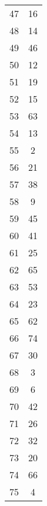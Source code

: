 \begin{table}
\begin{tabular}{c c }
47 & 16 \\
48 & 14 \\
49 & 46 \\
50 & 12 \\
51 & 19 \\
52 & 15 \\
53 & 63 \\
54 & 13 \\
55 & 2 \\
56 & 21 \\
57 & 38 \\
58 & 9 \\
59 & 45 \\
60 & 41 \\
61 & 25 \\
62 & 65 \\
63 & 53 \\
64 & 23 \\
65 & 62 \\
66 & 74 \\
67 & 30 \\
68 & 3 \\
69 & 6 \\
70 & 42 \\
71 & 26 \\
72 & 32 \\
73 & 20 \\
74 & 66 \\
75 & 4 \\
\hline
\end{tabular}
\end{table}
